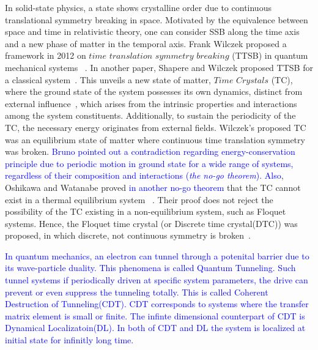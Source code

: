 \documentclass[%
reprint,
superscriptaddress,
amsmath,amssymb,showkeys,
aps,
prb,
]{revtex4-2}
\newcommand{\blue}[1]{\textcolor{blue}{#1}}
\begin{document}
	In solid-state physics, a state shows crystalline order due to continuous translational symmetry breaking in space. Motivated by the equivalence between space and time in relativistic theory, one can consider SSB along the time axis and a new phase of matter in the temporal axis. Frank Wilczek proposed a framework in 2012 on  $\textit{time translation symmetry breaking}$ (TTSB) in quantum mechanical systems ~\cite{wilczek_quantum_2012}. In another paper, Shapere and Wilczek proposed TTSB for a classical system~\cite{shapere_classical_2012}. This unveils a new state of matter, $\textit{Time Crystals}$ (TC), where the ground state of the system possesses its own dynamics, distinct from external influence~\cite{wilczek_quantum_2012}, which arises from the intrinsic properties and interactions among the system constituents. Additionally, to sustain the periodicity of the TC, the necessary energy originates from external fields. Wilczek's proposed TC was an equilibrium state of matter where continuous time translation symmetry was broken. \blue{Bruno pointed out a contradiction regarding energy-conservation principle due to periodic motion in ground state for a wide range of systems, regardless of their composition and interactions (\textit{the no-go theorem})\cite{Bruno2013}. Also}, Oshikawa and Watanabe proved \blue{in another no-go theorem} that the TC cannot exist in a thermal equilibrium system  ~\cite{watanabe_absence_2015}. Their proof does not reject the possibility of the TC  existing in a non-equilibrium system, such as Floquet systems. Hence, the Floquet time crystal (or Discrete time crystal(DTC)) was proposed, in which discrete, not continuous symmetry is broken~\cite{else_floquet_2016}.
	
	\blue{In quantum mechanics, an electron can tunnel through a potenital barrier due to its wave-particle duality. This phenomena is called Quantum Tunneling. Such tunnel systems if periodically driven at specific system parameters, the drive can prevent or even suppress the tunneling totally. This is called Coherent Destruction of Tunneling(CDT)\cite{Grossmann1991}. CDT corresponds to systems where the transfer matrix element is small or finite.  The infinte dimensional counterpart of CDT is Dynamical Localizatoin(DL). In both of CDT and DL the system is localized at initial state for infinitly long time\cite{Kayanuma2008}.}
	
\end{document}
